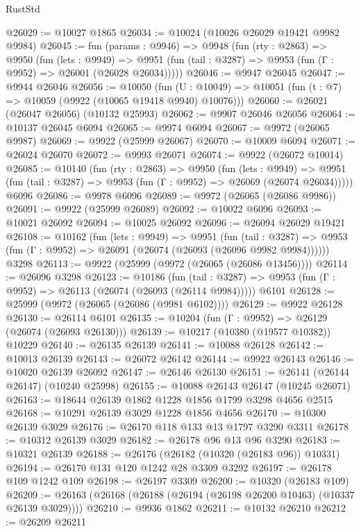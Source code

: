 \begin{lexlean}{RustStd}
\begin{coremodule}
@26029 := @10027 @1865
@26034 := @10024 (@10026 @26029 @19421 @9982 @9984)
@26045 := fun (params : @9946) =>
  @9948
    (fun (rty : @2863) =>
    @9950
      (fun (lets : @9949) =>
      @9951 (fun (tail : @3287) => @9953 (fun (Γ : @9952) => @26001 (@26028 @26034)))))
@26046 := @9947 @26045
@26047 := @9944 @26046
@26056 := @10050
    (fun (U : @10049) => @10051 (fun (t : @7) => @10059 (@9922 (@10065 @19418 @9940) @10076)))
@26060 := @26021 (@26047 @26056) (@10132 @25993)
@26062 := @9907 @26046 @26056
@26064 := @10137 @26045 @6094
@26065 := @9974 @6094
@26067 := @9972 (@26065 @9987)
@26069 := @9922 (@25999 @26067)
@26070 := @10009 @6094
@26071 := @26024 @26070
@26072 := @9993 @26071
@26074 := @9922 (@26072 @10014)
@26085 := @10140
    (fun (rty : @2863) =>
    @9950
      (fun (lets : @9949) =>
      @9951 (fun (tail : @3287) => @9953 (fun (Γ : @9952) => @26069 (@26074 @26034)))))
    @6096
@26086 := @9978 @6096
@26089 := @9972 (@26065 (@26086 @9986))
@26091 := @9922 (@25999 @26089)
@26092 := @10022 @6096
@26093 := @10021 @26092
@26094 := @10025 @26092
@26096 := @26094 @26029 @19421
@26108 := @10162
    (fun (lets : @9949) =>
    @9951
      (fun (tail : @3287) =>
      @9953 (fun (Γ : @9952) => @26091 (@26074 (@26093 (@26096 @9982 @9984))))))
    @3298
@26113 := @9922 (@25999 (@9972 (@26065 (@26086 @13456))))
@26114 := @26096 @3298
@26123 := @10186
    (fun (tail : @3287) => @9953 (fun (Γ : @9952) => @26113 (@26074 (@26093 (@26114 @9984)))))
    @6101
@26128 := @25999 (@9972 (@26065 (@26086 (@9981 @6102))))
@26129 := @9922 @26128
@26130 := @26114 @6101
@26135 := @10204 (fun (Γ : @9952) => @26129 (@26074 (@26093 @26130)))
@26139 := @10217 (@10380 (@19577 @10382)) @10229
@26140 := @26135 @26139
@26141 := @10088 @26128
@26142 := @10013 @26139
@26143 := @26072 @26142
@26144 := @9922 @26143
@26146 := @10020 @26139 @26092
@26147 := @26146 @26130
@26151 := @26141 (@26144 @26147) (@10240 @25998)
@26155 := @10088 @26143 @26147 (@10245 @26071)
@26163 := @18644 @26139 @1862 @1228 @1856 @1799 @3298 @4656 @2515
@26168 := @10291 @26139 @3029 @1228 @1856 @4656
@26170 := @10300 @26139 @3029
@26176 := @26170 @118 @133 @13 @1797 @3290 @3311
@26178 := @10312 @26139 @3029
@26182 := @26178 @96 @13 @96 @3290
@26183 := @10321 @26139
@26188 := @26176 (@26182 (@10320 (@26183 @96)) @10331)
@26194 := @26170 @131 @120 @1242 @28 @3309 @3292
@26197 := @26178 @109 @1242 @109
@26198 := @26197 @3309
@26200 := @10320 (@26183 @109)
@26209 := @26163 (@26168 (@26188 (@26194 (@26198 @26200 @10463) (@10337 @26139 @3029))))
@26210 := @9936 @1862
@26211 := @10132 @26210
@26212 := @26209 @26211

\end{coremodule}
\end{lexlean}
